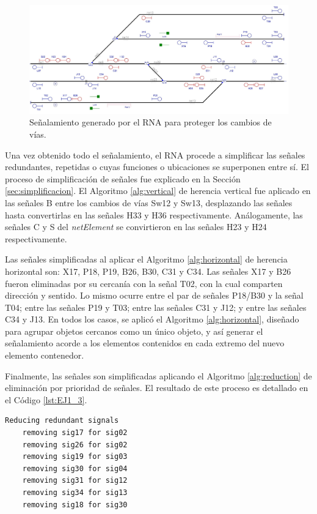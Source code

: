 	\begin{figure}[H]
		\centering
		\includegraphics[width=1\textwidth]{resultados-obtenidos/ejemplo1/images/1_step4.png}
		\centering\caption{Señalamiento generado por el RNA para proteger los cambios de vías.}
		\label{fig:EJ1_6}
	\end{figure}
	
	Una vez obtenido todo el señalamiento, el RNA procede a simplificar las señales redundantes, repetidas o cuyas funciones o ubicaciones se superponen entre sí. El proceso de simplificación de señales fue explicado en la Sección \ref{sec:simplificacion}. El Algoritmo \ref{alg:vertical} de herencia vertical fue aplicado en las señales B entre los cambios de vías Sw12 y Sw13, desplazando las señales hasta convertirlas en las señales H33 y H36 respectivamente. Análogamente, las señales C y S del \textit{netElement} se convirtieron en las señales H23 y H24 respectivamente.
	
	Las señales simplificadas al aplicar el Algoritmo \ref{alg:horizontal} de herencia horizontal son: X17, P18, P19, B26, B30, C31 y C34. Las señales X17 y B26 fueron eliminadas por su cercanía con la señal T02, con la cual comparten dirección y sentido. Lo mismo ocurre entre el par de señales P18/B30 y la señal T04; entre las señales P19 y T03; entre las señales C31 y J12; y entre las señales C34 y J13. En todos los casos, se aplicó el Algoritmo \ref{alg:horizontal}, diseñado para agrupar objetos cercanos como un único objeto, y así generar el señalamiento acorde a los elementos contenidos en cada extremo del nuevo elemento contenedor.
	
	Finalmente, las señales son simplificadas aplicando el Algoritmo \ref{alg:reduction} de eliminación por prioridad de señales. El resultado de este proceso es detallado en el Código \ref{lst:EJ1_3}.
	
	\begin{lstlisting}[language = {}, caption = Reducción de señalamiento por prioridad de señales, label = {lst:EJ1_3}]
	Reducing redundant signals
	removing sig17 for sig02
	removing sig26 for sig02
	removing sig19 for sig03
	removing sig30 for sig04
	removing sig31 for sig12
	removing sig34 for sig13
	removing sig18 for sig30
	\end{lstlisting}
	
